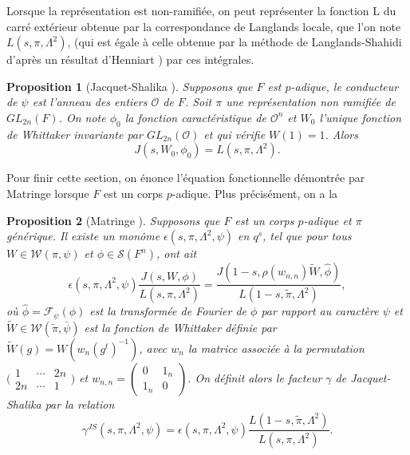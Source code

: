\documentclass{amsart}
\newtheorem{proposition}{Proposition}[section]
\begin{document}
  Lorsque la représentation est non-ramifiée, on peut représenter la fonction L du carré extérieur obtenue par la correspondance de Langlands locale, que l'on note $L(s, \pi, \Lambda^2)$, (qui est égale à celle obtenue par la méthode de Langlands-Shahidi d'après un résultat d'Henniart \cite{henniart}) par ces intégrales.
  \begin{proposition}[Jacquet-Shalika \cite{jacquet-shalika}]
  \label{calculnr}
  Supposons que $F$ est $p$-adique, le conducteur de $\psi$ est l'anneau des entiers $\mathcal{O}$ de $F$. Soit $\pi$ une représentation non ramifiée de $GL_{2n}(F)$. On note $\phi_0$ la fonction caractéristique de $\mathcal{O}^n$ et $W_0$ l'unique fonction de Whittaker invariante par $GL_{2n}(\mathcal{O})$ et qui vérifie $W(1)=1$. Alors
   \begin{equation}
   J(s,W_0,\phi_0) = L(s, \pi, \Lambda^2).
    \end{equation}
  \end{proposition}
  
  Pour finir cette section, on énonce l'équation fonctionnelle démontrée par Matringe lorsque $F$ est un corps $p$-adique. Plus précisément, on a la
 \begin{proposition}[Matringe \cite{matringe}]
 \label{funcloc}
 Supposons que $F$ est un corps $p$-adique et $\pi$ générique. Il existe un monôme $\epsilon(s,\pi,\Lambda^2,\psi)$ en $q^s$, tel que pour tous $W \in \mathcal{W}(\pi,\psi)$ et $\phi \in \mathcal{S}(F^n)$, ont ait
 \begin{equation}
 \epsilon(s, \pi, \Lambda^2, \psi) \frac{J(s,W,\phi)}{L(s,\pi,\Lambda^2)}  = \frac{J(1-s,\rho(w_{n,n})\tilde{W},\hat{\phi})}{L(1-s,\tilde{\pi},\Lambda^2)},
 \end{equation}
 où $\hat{\phi} = \mathcal{F}_\psi(\phi)$ est la transformée de Fourier de $\phi$ par rapport au caractère $\psi$ et $\tilde{W} \in \mathcal{W}(\tilde{\pi}, \bar{\psi})$ est la fonction de Whittaker définie par $\tilde{W}(g) = W(w_n(g^t)^{-1})$, avec $w_n$ la matrice associée à la permutation $\bigl(\begin{smallmatrix}
    1 & \cdots & 2n  \\
    2n & \cdots &  1 
  \end{smallmatrix}\bigr)$
  et
 $w_{n,n} = \begin{pmatrix}
0 & 1_n \\
1_n & 0
\end{pmatrix}$. On définit alors le facteur $\gamma$ de Jacquet-Shalika par la relation
\begin{equation}
\gamma^{JS}(s,\pi,\Lambda^2,\psi)  = \epsilon(s,\pi,\Lambda^2,\psi)\frac{L(1-s,\tilde{\pi},\Lambda^2)}{L(s,\pi,\Lambda^2)}.
\end{equation}
 \end{proposition}
 
\end{document}
